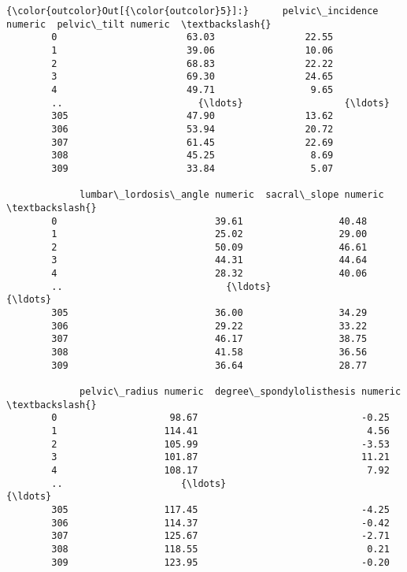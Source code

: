 \documentclass[11pt]{article}
\begin{document}
\begin{Verbatim}[commandchars=\\\{\}]
{\color{outcolor}Out[{\color{outcolor}5}]:}      pelvic\_incidence numeric  pelvic\_tilt numeric  \textbackslash{}
        0                       63.03                22.55   
        1                       39.06                10.06   
        2                       68.83                22.22   
        3                       69.30                24.65   
        4                       49.71                 9.65   
        ..                        {\ldots}                  {\ldots}   
        305                     47.90                13.62   
        306                     53.94                20.72   
        307                     61.45                22.69   
        308                     45.25                 8.69   
        309                     33.84                 5.07   
        
             lumbar\_lordosis\_angle numeric  sacral\_slope numeric  \textbackslash{}
        0                            39.61                 40.48   
        1                            25.02                 29.00   
        2                            50.09                 46.61   
        3                            44.31                 44.64   
        4                            28.32                 40.06   
        ..                             {\ldots}                   {\ldots}   
        305                          36.00                 34.29   
        306                          29.22                 33.22   
        307                          46.17                 38.75   
        308                          41.58                 36.56   
        309                          36.64                 28.77   
        
             pelvic\_radius numeric  degree\_spondylolisthesis numeric  \textbackslash{}
        0                    98.67                             -0.25   
        1                   114.41                              4.56   
        2                   105.99                             -3.53   
        3                   101.87                             11.21   
        4                   108.17                              7.92   
        ..                     {\ldots}                               {\ldots}   
        305                 117.45                             -4.25   
        306                 114.37                             -0.42   
        307                 125.67                             -2.71   
        308                 118.55                              0.21   
        309                 123.95                             -0.20   
        

\end{Verbatim}
\end{document}

